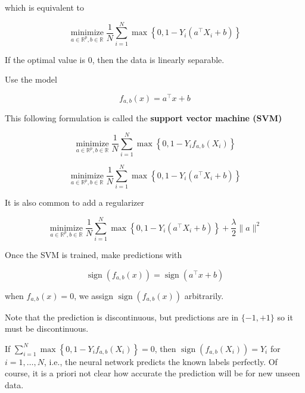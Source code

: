 which is equivalent to

$$
\underset{a \in \mathbb{R}^{p}, b \in \mathbb{R}}{\operatorname{minimize}} \frac{1}{N} \sum_{i=1}^{N} \max \left\{0,1-Y_{i}\left(a^{\top} X_{i}+b\right)\right\}
$$

If the optimal value is 0, then the data is linearly separable.

\begin{definition}
    Use the model

    $$
    f_{a, b}(x)=a^{\top} x+b
    $$

    This following formulation is called the \textbf{support vector machine (SVM)}

    $$
    \underset{a \in \mathbb{R}^{p}, b \in \mathbb{R}}{\operatorname{minimize}} \frac{1}{N} \sum_{i=1}^{N} \max \left\{0,1-Y_{i} f_{a, b}\left(X_{i}\right)\right\}
    $$

    $$
    \underset{a \in \mathbb{R}^{p}, b \in \mathbb{R}}{\operatorname{minimize}} \frac{1}{N} \sum_{i=1}^{N} \max \left\{0,1-Y_{i}\left(a^{\top} X_{i}+b\right)\right\}
    $$

    It is also common to add a regularizer

    $$
    \underset{a \in \mathbb{R}^{p}, b \in \mathbb{R}}{\operatorname{minimize}} \frac{1}{N} \sum_{i=1}^{N} \max \left\{0,1-Y_{i}\left(a^{\top} X_{i}+b\right)\right\}+\frac{\lambda}{2}\|a\|^{2}
    $$
\end{definition}

\begin{concept}
    Once the SVM is trained, make predictions with

    $$
    \operatorname{sign}\left(f_{a, b}(x)\right)=\operatorname{sign}\left(a^{\top} x+b\right)
    $$

    when $f_{a, b}(x)=0$, we assign $\operatorname{sign}\left(f_{a, b}(x)\right)$ arbitrarily.

    Note that the prediction is discontinuous, but predictions are in $\{-1,+1\}$ so it must be discontinuous.

    If $\sum_{i=1}^{N} \max \left\{0,1-Y_{i} f_{a, b}\left(X_{i}\right)\right\}=0$, then $\operatorname{sign}\left(f_{a, b}\left(X_{i}\right)\right)=Y_{i}$ for $i=1, \ldots, N$, i.e., the neural network predicts the known labels perfectly.
    Of course, it is a priori not clear how accurate the prediction will be for new unseen data.
\end{concept}

